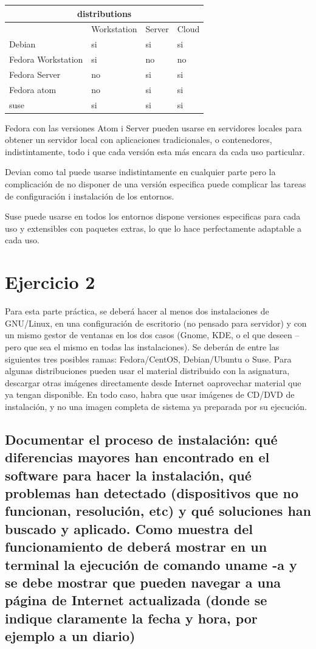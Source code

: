 \documentclass[preprint,11pt]{elsarticle}
\begin{document}
\begin{tabular}{ |p{4cm}||p{3cm}|p{3cm}|p{3cm}|  }
 \hline
 \multicolumn{4}{|c|}{distributions} \\
 \hline
  &Workstation  &Server  &Cloud \\
 \hline
Debian &si &si &si\\
Fedora Workstation  &si &no &no\\
Fedora Server &no &si &si\\
Fedora atom &no &si &si \\
suse &si &si &si \\
 \hline
\end{tabular}
\bigskip 

Fedora con las versiones Atom i Server pueden usarse en servidores locales para obtener un servidor local con aplicaciones tradicionales, o contenedores, indistintamente, todo i que cada versión esta más encara da cada uso particular.\bigskip

Devian como tal puede usarse indistintamente en cualquier parte pero la complicación de no disponer de una versión especifica puede complicar las tareas de configuración i instalación de los entornos.\bigskip

Suse puede usarse en todos los entornos dispone versiones especificas para cada uso y extensibles con paquetes extras, lo que lo hace perfectamente adaptable a cada uso.\bigskip

\clearpage
\section{Ejercicio 2}
Para esta parte práctica, se deberá hacer al menos dos instalaciones de GNU/Linux, en una configuración de escritorio (no pensado para servidor) y con un mismo gestor de ventanas en los dos casos (Gnome, KDE, o el que deseen – pero que sea el mismo en todas las instalaciones). Se deberán de entre las siguientes tres posibles ramas: Fedora/CentOS, Debian/Ubuntu o Suse. Para algunas distribuciones pueden usar el material distribuido con la asignatura, descargar otras imágenes directamente desde Internet oaprovechar material que ya tengan disponible. En todo caso, habra que usar imágenes de CD/DVD de instalación, y no una imagen completa de sistema ya preparada por su ejecución.\bigskip

\subsection{Documentar el proceso de instalación: qué diferencias mayores han encontrado en el software para hacer la instalación, qué problemas han detectado (dispositivos que no funcionan, resolución, etc) y qué soluciones han buscado y aplicado. Como muestra del funcionamiento de deberá mostrar en un terminal la ejecución de comando uname -a y se debe mostrar que pueden navegar a una página de Internet actualizada (donde se indique claramente la fecha y hora, por ejemplo a un diario) }
\end{document}
